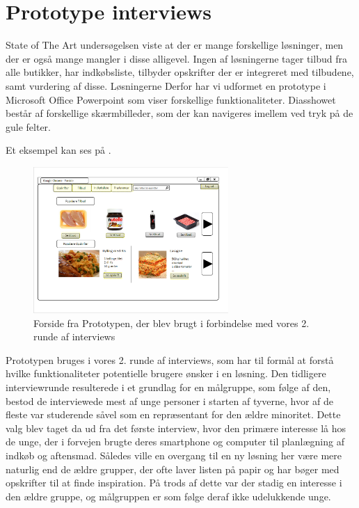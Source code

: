 \section{Prototype interviews}\label{section:interview2}
State of The Art undersøgelsen viste at der er mange forskellige løsninger, men der er også mange mangler i disse alligevel.
Ingen af løsningerne tager tilbud fra alle butikker, har indkøbsliste, tilbyder opskrifter der er integreret med tilbudene, samt vurdering af disse.
Løsningerne
Derfor har vi udformet en prototype i Microsoft Office Powerpoint som viser forskellige funktionaliteter.
Diasshowet består af forskellige skærmbilleder, som der kan navigeres imellem ved tryk på de gule felter.

Et eksempel kan ses på .

\begin{figure}
\vspace{-20pt}
	\begin{center}
		\includegraphics[width=0.66\textwidth]{images/Images/prototype-forside.PNG}
	\end{center}
	\vspace{-20pt}
	\caption{Forside fra Prototypen, der blev brugt i forbindelse med vores 2. runde af interviews}\label{ss:Prototype}
	\vspace{-20pt}
\end{figure}

Prototypen bruges i vores 2. runde af interviews, som har til formål at forstå hvilke funktionaliteter potentielle brugere ønsker i en løsning.
Den tidligere interviewrunde resulterede i et grundlag for en målgruppe, som følge af den, bestod de interviewede mest af unge personer i starten af tyverne, hvor af de fleste var studerende såvel som en repræsentant for den ældre minoritet.
Dette valg blev taget da ud fra det første interview, hvor den primære interesse lå hos de unge, der i forvejen brugte deres smartphone og computer til planlægning af indkøb og aftensmad.
Således ville en overgang til en ny løsning her være mere naturlig end de ældre grupper, der ofte laver listen på papir og har bøger med opskrifter til at finde inspiration.
På trods af dette var der stadig en interesse i den ældre gruppe, og målgruppen er som følge deraf ikke udelukkende unge.

